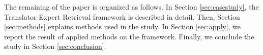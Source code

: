 The remaining of the paper is organized as follows. In Section \ref{sec:casestudy}, the Translator-Expert Retrieval framework is described in detail. Then, Section \ref{sec:methods} explains methods used in the study. In Section \ref{sec:apply}, we report the result of applied methods on the framework. Finally, we conclude the study in Section \ref{sec:conclusion}.
